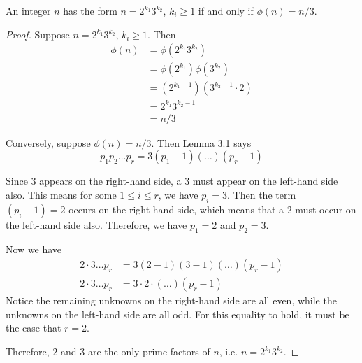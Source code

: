 \begin{prop}[11.12b]
    An integer $n$ has the form $n=2^{k_1} 3^{k_2}$, $k_i \geq 1$ if and only if 
    $\phi(n) = n/3$.
\end{prop}
\begin{proof}
    Suppose $n = 2^{k_1} 3^{k_2}$, $k_i \geq 1$. Then
    \begin{align*}
        \phi(n) &= \phi(2^{k_1} 3^{k_2}) \\
                &= \phi(2^{k_1}) \phi(3^{k_2}) \\
                &= (2^{k_1 - 1})(3^{k_2 - 1} \cdot 2) \\
                &= 2^{k_1} 3^{k_2 - 1} \\
                &= n/3
    \end{align*}
    
    Conversely, suppose $\phi(n) = n/3$. Then Lemma 3.1 says
    \[ p_1 p_2 \ldots p_r = 3 (p_1 - 1)(\ldots)(p_r - 1) \]
    
    Since 3 appears on the right-hand side, a 3 must appear on the left-hand 
    side also. This means for some $1 \leq i \leq r$, we have $p_i = 3$. Then
    the term $(p_i - 1) = 2$ occurs on the right-hand side, which means that
    a 2 must occur on the left-hand side also. Therefore, we have $p_1 = 2$ and
    $p_2 = 3$.
    
    Now we have
    \begin{align*}
    2 \cdot 3 \ldots p_r &= 3 (2 - 1)(3-1)(\ldots)(p_r - 1) \\
    2 \cdot 3 \ldots p_r &= 3 \cdot 2 \cdot (\ldots)(p_r - 1)
    \end{align*}
    Notice the remaining unknowns on the right-hand side are all even, while
    the unknowns on the left-hand side are all odd. For this equality to hold, 
    it must be the case that $r = 2$.
    
    Therefore, 2 and 3 are the only prime factors of $n$, i.e. 
    $n=2^{k_1} 3^{k_2}$.
\end{proof}



